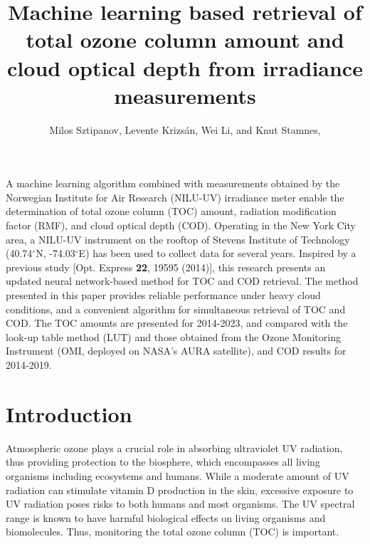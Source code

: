 \documentclass{optica-article}
\begin{document}
\title{Machine learning based retrieval of total ozone column amount and cloud optical depth from irradiance measurements}

\author{Milos Sztipanov, Levente Krizs\'an, 
Wei Li, and Knut Stamnes, }

\address{Department of Physics, Stevens Institute of Technology, Hoboken, New Jersey, USA\\}



\begin{abstract*} 
A machine learning algorithm combined with measurements obtained by the Norwegian Institute for Air Research (NILU-UV) irradiance meter enable the determination of total ozone column (TOC) amount, radiation modification factor (RMF), and cloud optical depth (COD). 
Operating in the New York City area, a NILU-UV instrument on the rooftop of Stevens Institute of Technology (40.74$^\circ$N, -74.03$^\circ$E) has been used to collect data for several years. 
Inspired by a previous study [Opt. Express \textbf{22}, 19595 (2014)], this research presents an updated neural network-based method for TOC and COD retrieval.
The method presented in this paper provides reliable performance under heavy cloud conditions, and a convenient algorithm for simultaneous retrieval of TOC and COD.
The TOC amounts are presented for 2014-2023, and compared with the look-up table method (LUT) and those obtained from the Ozone Monitoring Instrument (OMI, deployed on NASA's AURA satellite), and COD results for 2014-2019.


\end{abstract*}

\section{Introduction}
\label{sec-intro}
Atmospheric ozone plays a crucial role in absorbing ultraviolet UV radiation, thus providing protection to the biosphere, which encompasses all living organisms including ecosystems and humans.
While a moderate amount of UV radiation can stimulate vitamin D production in the skin, excessive exposure to UV radiation poses risks to both humans and most organisms. 
The UV spectral range is known to have harmful biological effects on living organisms and biomolecules. 
Thus, monitoring the total ozone column (TOC) is important. 
\end{document}
